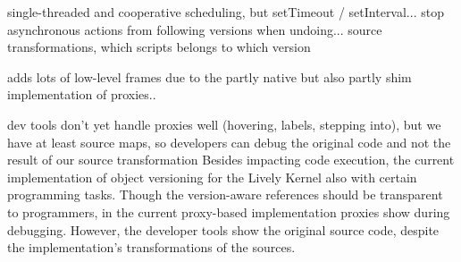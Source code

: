 
single-threaded and cooperative scheduling, but setTimeout / setInterval... stop asynchronous actions from following versions when undoing... source transformations, which scripts belongs to which version




adds lots of low-level frames due to the partly native but also partly shim implementation of proxies..

dev tools don’t yet handle proxies well (hovering, labels, stepping into), but we have at least source maps, so developers can debug the original code and not the result of our source transformation
Besides impacting code execution, the current implementation of object versioning for the Lively Kernel also with certain programming tasks.
Though the version-aware references should be transparent to programmers, in the current proxy-based implementation proxies show during debugging.
However, the developer tools show the original source code, despite the implementation's transformations of the sources.





